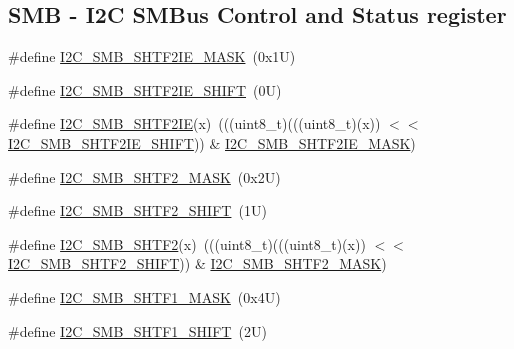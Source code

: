\subsection*{S\+MB -\/ I2C S\+M\+Bus Control and Status register}
\begin{DoxyCompactItemize}
\item 
\#define \mbox{\hyperlink{group___i2_c___register___masks_gad123ad3f9e1362d2ee5bd403cdf34327}{I2\+C\+\_\+\+S\+M\+B\+\_\+\+S\+H\+T\+F2\+I\+E\+\_\+\+M\+A\+SK}}~(0x1\+U)
\item 
\#define \mbox{\hyperlink{group___i2_c___register___masks_ga431377427b6cae03a360309ac07a4559}{I2\+C\+\_\+\+S\+M\+B\+\_\+\+S\+H\+T\+F2\+I\+E\+\_\+\+S\+H\+I\+FT}}~(0\+U)
\item 
\#define \mbox{\hyperlink{group___i2_c___register___masks_gac8955a8d2c42508c67b42709dd15219c}{I2\+C\+\_\+\+S\+M\+B\+\_\+\+S\+H\+T\+F2\+IE}}(x)~(((uint8\+\_\+t)(((uint8\+\_\+t)(x)) $<$$<$ \mbox{\hyperlink{group___i2_c___register___masks_ga431377427b6cae03a360309ac07a4559}{I2\+C\+\_\+\+S\+M\+B\+\_\+\+S\+H\+T\+F2\+I\+E\+\_\+\+S\+H\+I\+FT}})) \& \mbox{\hyperlink{group___i2_c___register___masks_gad123ad3f9e1362d2ee5bd403cdf34327}{I2\+C\+\_\+\+S\+M\+B\+\_\+\+S\+H\+T\+F2\+I\+E\+\_\+\+M\+A\+SK}})
\item 
\#define \mbox{\hyperlink{group___i2_c___register___masks_gac393f25577923046bb7755b7f398db70}{I2\+C\+\_\+\+S\+M\+B\+\_\+\+S\+H\+T\+F2\+\_\+\+M\+A\+SK}}~(0x2\+U)
\item 
\#define \mbox{\hyperlink{group___i2_c___register___masks_gaeaa26602cb9aabcf738aef5e95b7672c}{I2\+C\+\_\+\+S\+M\+B\+\_\+\+S\+H\+T\+F2\+\_\+\+S\+H\+I\+FT}}~(1\+U)
\item 
\#define \mbox{\hyperlink{group___i2_c___register___masks_gad70d76892456fd348b7fdc155b42d0d6}{I2\+C\+\_\+\+S\+M\+B\+\_\+\+S\+H\+T\+F2}}(x)~(((uint8\+\_\+t)(((uint8\+\_\+t)(x)) $<$$<$ \mbox{\hyperlink{group___i2_c___register___masks_gaeaa26602cb9aabcf738aef5e95b7672c}{I2\+C\+\_\+\+S\+M\+B\+\_\+\+S\+H\+T\+F2\+\_\+\+S\+H\+I\+FT}})) \& \mbox{\hyperlink{group___i2_c___register___masks_gac393f25577923046bb7755b7f398db70}{I2\+C\+\_\+\+S\+M\+B\+\_\+\+S\+H\+T\+F2\+\_\+\+M\+A\+SK}})
\item 
\#define \mbox{\hyperlink{group___i2_c___register___masks_gaefffa6f332bf3bd19ea55db0d1848546}{I2\+C\+\_\+\+S\+M\+B\+\_\+\+S\+H\+T\+F1\+\_\+\+M\+A\+SK}}~(0x4\+U)
\item 
\#define \mbox{\hyperlink{group___i2_c___register___masks_ga27af2fe0000903e76be422f1b0d0d277}{I2\+C\+\_\+\+S\+M\+B\+\_\+\+S\+H\+T\+F1\+\_\+\+S\+H\+I\+FT}}~(2\+U)

\end{DoxyCompactItemize}
